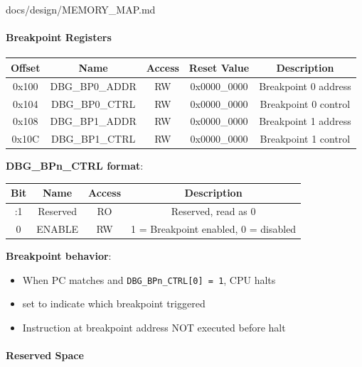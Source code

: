 \begin{relocated}{docs/design/MEMORY_MAP.md}
\paragraph{Breakpoint Registers}\label{ds:mm:memory-map:breakpoint-registers}

{
\begin{longtable}[]{@{}ccccc@{}}
\toprule\noalign{}
Offset & Name & Access & Reset Value & Description \\
\midrule\noalign{}
\endhead
\bottomrule\noalign{}
\endlastfoot
0x100 & DBG\_\allowbreak{}BP0\_\allowbreak{}ADDR & RW &
0x0000\_\allowbreak{}0000 & Breakpoint 0 address \\
0x104 & DBG\_\allowbreak{}BP0\_\allowbreak{}CTRL & RW &
0x0000\_\allowbreak{}0000 & Breakpoint 0 control \\
0x108 & DBG\_\allowbreak{}BP1\_\allowbreak{}ADDR & RW &
0x0000\_\allowbreak{}0000 & Breakpoint 1 address \\
0x10C & DBG\_\allowbreak{}BP1\_\allowbreak{}CTRL & RW &
0x0000\_\allowbreak{}0000 & Breakpoint 1 control \\
\end{longtable}
}

\textbf{DBG\_\allowbreak{}BPn\_\allowbreak{}CTRL format}:

{
\begin{longtable}[]{@{}cccc@{}}
\toprule\noalign{}
Bit & Name & Access & Description \\
\midrule\noalign{}
\endhead
\bottomrule\noalign{}
\endlastfoot
31:1 & Reserved & RO & Reserved, read as 0 \\
0 & ENABLE & RW & 1 = Breakpoint enabled, 0 = disabled \\
\end{longtable}
}

\textbf{Breakpoint behavior}:

\begin{itemize}
\tightlist
\item
  When PC matches  and
  \texttt{DBG\_\allowbreak{}BPn\_\allowbreak{}CTRL[0]\ =\allowbreak{}\ 1},
  CPU halts
\item
   set to indicate which breakpoint triggered
\item
  Instruction at breakpoint address NOT executed before halt
\end{itemize}

\paragraph{Reserved Space}\label{ds:mm:memory-map:reserved-space}


\end{relocated}
